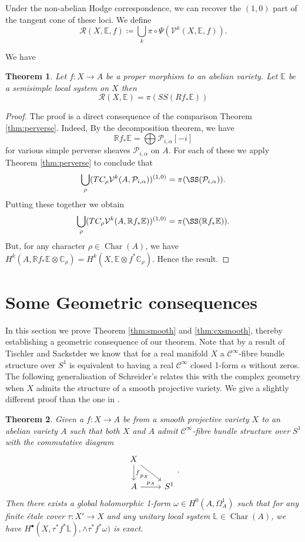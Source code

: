 \documentclass[12pt,reqno]{amsart}
\newtheorem{theorem}{Theorem}
\theoremstyle{question}
\theoremstyle{definition}
\theoremstyle{remark}
\theoremstyle{cited}
\theoremstyle{citeddef}
\def\bt{\begin{theorem}}
\def\et{\end{theorem}}
\DeclareMathOperator{\Char}{Char}
\newcommand{\sP}{\mathcal{P}}
\newcommand{\sR}{\mathcal{R}}
\newcommand\sV{{\mathcal V}}
\newcommand{\bbC}{\mathbb{C}}
\newcommand{\bbE}{\mathbb{E}}
\newcommand{\bbL}{\mathbb{L}}
\newcommand{\bbR}{\mathbb{R}}
\newcommand{\scrC}{\mathscr{C}}
\begin{document}
Under the non-abelian Hodge correspondence, we can recover the $(1,0)$ part of the tangent cone of these loci. We define
\[\sR(X, \bbE, f) \coloneqq \bigcup_k\pi\circ\Psi(\sV^k(X,\bbE, f)).\]

We have

\bt
Let $f\colon X\to A$ be a proper morphism to an abelian variety. Let $\bbE$ be a semisimple local system on $X$ then
\[\sR(X,\bbE) = \pi(SS(Rf_*\bbE))\]
\et

\begin{proof}
The proof is a direct consequence of the comparison Theorem \ref{thm:perverse}. Indeed,
By the decomposition theorem, we have
\[\bbR f_*\bbE = \bigoplus\sP_{i,\alpha}[-i]\]
for various simple perverse sheaves $\sP_{i,\alpha}$ on $A$. For each of these we apply Theorem \ref{thm:perverse}
to conclude that
\[\bigcup_{\rho}(TC_{\rho}\sV^k(A, \sP_{i,\alpha}))^{(1,0)} = \pi(\SS(\sP_{i,\alpha})).\]
Putting these together we obtain
\[\bigcup_{\rho}(TC_{\rho}\sV^k(A, \bbR f_*\bbE))^{(1,0)} = \pi(\SS(\bbR f_*\bbE)).\]
But, for any character $\rho\in \Char(A)$, we have
$H^k(A, \bbR f_*\bbE\otimes \bbC_{\rho}) = H^k(X, \bbE\otimes f^*\bbC_{\rho})$. Hence the result.
\end{proof}







\section{Some Geometric consequences}
In this section we prove Theorem \ref{thm:smooth} and \ref{thm:cxsmooth}, thereby establishing a geometric consequence of our theorem. 
Note that by a result of Tischler \cite[Theorem 1]{Tis70} and Sackstder \cite[p.\ 96]{Sac65} we know that for a real manifold $X$
a $\scrC^{\infty}$-fibre bundle structure over $S^1$ is equivalent to having a real $\scrC^{\infty}$ closed 1-form $\alpha$ without zeros. 
The following generalisation of Schreider's \cite[Theorem 1.2]{Sch19} relates this with the complex geometry when $X$ admits
the structure of a smooth projective variety. We give a slightly different proof than the one in \cite{Sch19}.   

\begin{theorem}\label{thm:schreieder}
Given a $f\colon X\to A$ be from a smooth projective variety $X$ to an abelian variety $A$ such that
both $X$ and $A$ admit $\scrC^{\infty}$-fibre bundle structure over $S^1$ with the commutative diagram
\[\begin{tikzcd}
	X\ar[dr, "p_X"']\ar[d, "f"]& \\
	A\ar[r, "p_A"]&S^1
\end{tikzcd}.\]  
Then there exists a global holomorphic 1-form $\omega\in H^0(A,\Omega_A^1)$ such that for any finite \'etale cover $\tau\colon X' \to X$ and
any unitary local system $\bbL\in \Char(A)$, we have $H^{\bullet}(X, \tau^*f^*\bbL), \wedge\tau^*f^*\omega)$ is exact. 
\label{thm:schreieder}
\end{theorem} 
\end{document}
